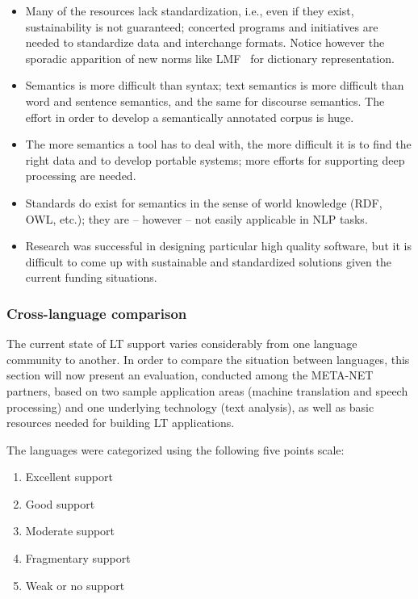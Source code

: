 \documentclass[]{../metanetpaper}
\begin{document}
\begin{multicols}{2}
\begin{itemize}
\item Many of the resources lack standardization, i.e., even if they
  exist, sustainability is not guaranteed; concerted programs and
  initiatives are needed to standardize data and interchange
  formats. Notice however the sporadic apparition of new norms like
  LMF~\cite{LMF} for dictionary representation.

\item Semantics is more difficult than syntax; text semantics is more
difficult than word and sentence semantics, and the same for discourse
semantics. The effort in order to develop a semantically annotated
corpus is huge.

\item The more semantics a tool has to deal with, the more difficult it is
to find the right data and to develop portable systems; more efforts
for supporting deep processing are needed.

\item Standards do exist for semantics in the sense of world knowledge (RDF,
OWL, etc.); they are – however – not easily applicable in NLP tasks.

\item Research was successful in designing particular high quality software,
but it is difficult to come up with sustainable and standardized
solutions given the current funding situations.
\end{itemize}

\subsubsection{Cross-language comparison}

The current state of LT support varies considerably from one language
community to another. In order to compare the situation between
languages, this section will now present an evaluation, conducted
among the META-NET partners, based on two sample application areas
(machine translation and speech processing) and one underlying
technology (text analysis), as well as basic resources needed for
building LT applications.

The languages were categorized using the following five points scale:
\begin{enumerate}
\item Excellent support
\item Good support
\item Moderate support
\item Fragmentary support
\item Weak or no support
\end{enumerate}


\end{multicols}
\end{document}
